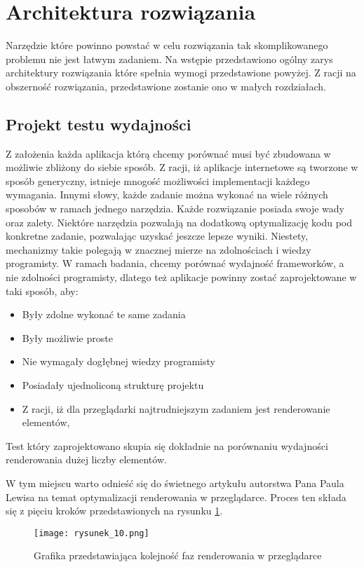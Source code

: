 \section{Architektura rozwiązania}

Narzędzie które powinno powstać w celu rozwiązania tak skomplikowanego problemu nie jest łatwym zadaniem.
Na wstępie przedstawiono ogólny zarys architektury rozwiązania które spełnia wymogi przedstawione powyżej.
Z racji na obszerność rozwiązania, przedstawione zostanie ono w małych rozdziałach.

\subsection{Projekt testu wydajności}
Z założenia każda aplikacja którą chcemy porównać musi być zbudowana w możliwie zbliżony do siebie sposób.
Z racji, iż aplikacje internetowe są tworzone w sposób generyczny, istnieje mnogość możliwości implementacji każdego wymagania.
Innymi słowy, każde zadanie można wykonać na wiele różnych sposobów w ramach jednego narzędzia.
Każde rozwiązanie posiada swoje wady oraz zalety. Niektóre narzędzia pozwalają na dodatkową optymalizację kodu pod konkretne zadanie, pozwalając uzyskać jeszcze lepsze wyniki.
Niestety, mechanizmy takie polegają w znacznej mierze na zdolnościach i wiedzy programisty.
W ramach badania, chcemy porównać wydajność frameworków, a nie zdolności programisty, dlatego też aplikacje powinny zostać zaprojektowane w taki sposób, aby:
\begin{itemize}
    \item Były zdolne wykonać te same zadania
    \item Były możliwie proste
    \item Nie wymagały dogłębnej wiedzy programisty
    \item Posiadały ujednoliconą strukturę projektu
    \item Z racji, iż dla przeglądarki najtrudniejszym zadaniem jest renderowanie elementów,     
\end{itemize}
Test który zaprojektowano skupia się dokładnie na porównaniu wydajności renderowania dużej liczby elementów.

W tym miejscu warto odnieść się do świetnego artykułu autorstwa Pana Paula Lewisa \cite{rendering-performance} na temat optymalizacji renderowania w przeglądarce. Proces ten składa się z pięciu kroków przedstawionych na rysunku \ref{fig:rysunek_10}. 

\begin{figure}[htbp]
    \centering
    \texttt{[image: rysunek\_10.png]}
    \caption{Grafika przedstawiająca kolejność faz renderowania w przeglądarce}
    \label{fig:rysunek_10}
\end{figure}

